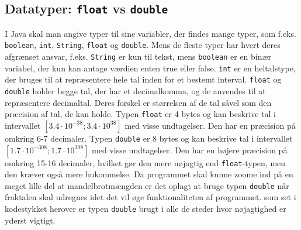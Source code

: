\documentclass{article}
\begin{document}
\subsection{Datatyper: \texttt{float} vs \texttt{double}}
I Java skal man angive typer til sine variabler, der findes mange typer, som f.eks. \texttt{boolean}, \texttt{int}, \texttt{String}, \texttt{float} og \texttt{double}. Mens de fleste typer har hvert deres afgrænset ansvar, f.eks. \texttt{String} er kun til tekst, mens \texttt{boolean} er en binær variabel, der kun kan antage værdien enten true eller false. \texttt{int} er en heltalstype, der bruges til at repræsentere hele tal inden for et bestemt interval. \texttt{float} og \texttt{double} holder begge tal, der har et decimalkomma, og de anvendes til at repræsentere decimaltal. Deres forskel er størrelsen af de tal såvel som den præcision af tal, de kan holde. Typen \texttt{float} er 4 bytes og kan beskrive tal i intervallet $[3.4\cdot10^{-38} ; 3.4\cdot10^{38}]$ med visse undtagelser. Den har en præcision på omkring 6-7 decimaler. Typen \texttt{double} er 8 bytes og kan beskrive tal i intervallet $[1.7\cdot10^{-308} ; 1.7\cdot10^{308}]$ med visse undtagelser. Den har en højere præcision på omkring 15-16 decimaler, hvilket gør den mere nøjagtig end \texttt{float}-typen, men den kræver også mere hukommelse. Da programmet skal kunne zoome ind på en meget lille del at mandelbrotmængden er det oplagt at bruge typen \texttt{double} når fraktalen skal udregnes idet det vil øge funktionaliteten af programmet. som set i kodestykket herover er typen \texttt{double} brugt i alle de steder hvor nøjagtighed er yderst vigtigt.

\newpage
\end{document}
